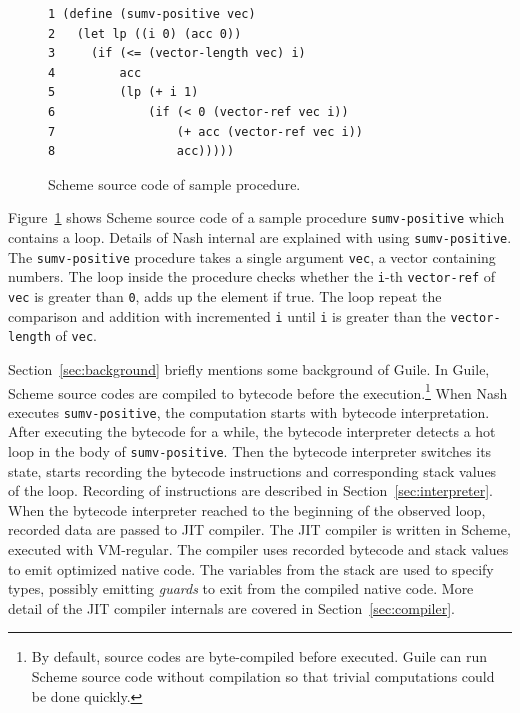\documentclass[preprint, 10pt]{sigplanconf}
\begin{document}
\begin{figure}
  \begin{center}
    \small
\begin{verbatim}
1 (define (sumv-positive vec)
2   (let lp ((i 0) (acc 0))
3     (if (<= (vector-length vec) i)
4         acc
5         (lp (+ i 1)
6             (if (< 0 (vector-ref vec i))
7                 (+ acc (vector-ref vec i))
8                 acc)))))
\end{verbatim}
\end{center}
\caption{Scheme source code of sample procedure.}
\label{fig:scmloop}
\end{figure}

Figure~\hyperref[fig:scmloop]{\ref{fig:scmloop}} shows Scheme source code of a
sample procedure \texttt{sumv-positive} which contains a loop. Details of Nash
internal are explained with using \texttt{sumv-positive}. The
\texttt{sumv-positive} procedure takes a single argument \texttt{vec}, a
vector containing numbers. The loop inside the procedure checks whether the
\texttt{i}-th \texttt{vector-ref} of \texttt{vec} is greater than \texttt{0},
adds up the element if true. The loop repeat the comparison and addition with
incremented \texttt{i} until \texttt{i} is greater than the
\texttt{vector-length} of \texttt{vec}.

Section~\hyperref[sec:background]{\ref{sec:background}} briefly mentions some
background of Guile. In Guile, Scheme source codes are compiled to bytecode
before the execution.\footnote{By default, source codes are byte-compiled
  before executed. Guile can run Scheme source code without compilation so
  that trivial computations could be done quickly.} When Nash executes
\texttt{sumv-positive}, the computation starts with bytecode
interpretation. After executing the bytecode for a while, the bytecode
interpreter detects a hot loop in the body of \texttt{sumv-positive}. Then the
bytecode interpreter switches its state, starts recording the bytecode
instructions and corresponding stack values of the loop. Recording of
instructions are described in
Section~\hyperref[sec:interpreter]{\ref{sec:interpreter}}. When the bytecode
interpreter reached to the beginning of the observed loop, recorded data are
passed to JIT compiler. The JIT compiler is written in Scheme, executed with
VM-regular. The compiler uses recorded bytecode and stack values to emit
optimized native code. The variables from the stack are used to specify types,
possibly emitting \textit{guards} to exit from the compiled native code. More
detail of the JIT compiler internals are covered in
Section~\hyperref[sec:compiler]{\ref{sec:compiler}}.
\end{document}
